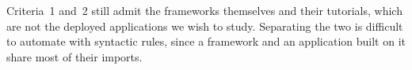 Criteria~1 and~2 still admit the frameworks themselves and their tutorials, which are not the deployed applications we wish to study. Separating the two is difficult to automate with syntactic rules, since a framework and an application built on it share most of their imports. 





